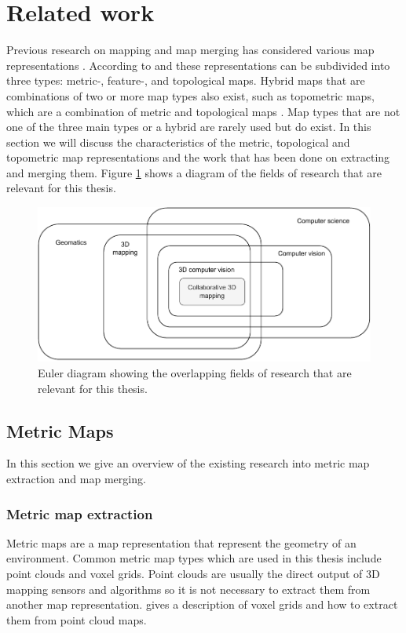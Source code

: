 \section{Related work}
Previous research on mapping and map merging has considered various map representations \citep{tomatis_hybrid_2003,huang_topological_2005,bonanni_3-d_2017,gholamishahbandi_2d_2019}. According to \citet{andersone_heterogeneous_2019} and \citet{yu_review_2020} these representations can be subdivided into three types: metric-, feature-, and topological maps. Hybrid maps that are combinations of two or more map types also exist, such as topometric maps, which are a combination of metric and topological maps \citep{yu_review_2020}. Map types that are not one of the three main types or a hybrid are rarely used but do exist\citep{yu_review_2020}. In this section we will discuss the characteristics of the metric, topological and topometric map representations and the work that has been done on extracting and merging them. Figure \ref{fig:euler} shows a diagram of the fields of research that are relevant for this thesis.

\begin{figure}[h]
    \centering
    \includegraphics*[width=.8\textwidth]{./fig/euler_diagram.drawio.pdf}
    \caption{Euler diagram showing the overlapping fields of research that are relevant for this thesis.}
    \label{fig:euler}
\end{figure}


\subsection{Metric Maps}
\label{section:metric_map_merging}
In this section we give an overview of the existing research into metric map extraction and map merging.

\subsubsection{Metric map extraction}
Metric maps are a map representation that represent the geometry of an environment. Common metric map types which are used in this thesis include point clouds and voxel grids. Point clouds are usually the direct output of 3D mapping sensors and algorithms so it is not necessary to extract them from another map representation. \citet{elfes_occupancy_1990} gives a description of voxel grids and how to extract them from point cloud maps.

